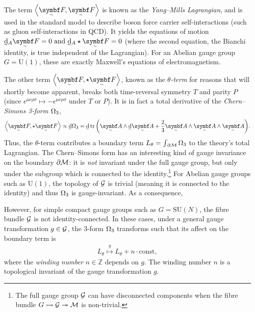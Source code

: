 The term $\ang{\tsbm F, \tsbm F}$ is known as the \emph{Yang--Mills Lagrangian}, and is used in the standard model to describe boson force carrier self-interactions (such as gluon self-interactions in QCD).
It yields the equations of motion 
\begin{math}
	\ts\dd_A\tsbm F = 0
	\text{ and }
	\ts\dd_A\star\tsbm F = 0
\end{math}
(where the second equation, the Bianchi identity, is true independent of the Lagrangian).
For an Abelian gauge group $G = \mathrm{U}(1)$, these are exactly Maxwell's equations of electromagnetism.

The other term $\ang{\tsbm F, \star\tsbm F}$, known as the \emph{$\theta$-term} for reasons that will shortly become apparent, breaks both time-reversal symmetry $T$ and parity $P$ (since $\epsilon^{\mu\nu\rho\sigma} \mapsto -\epsilon^{\mu\nu\rho\sigma}$ under $T$ or $P$).
It is in fact a total derivative of the \emph{Chern--Simons 3-form} $\csform$,
\begin{align}
	\ang{\tsbm F, \star\tsbm F}
	\propto \ts\dd\csform
	= \ts\dd\tr\qty(\tsbm A\wedge\ts\dd\tsbm A + \frac{2}{3}\tsbm A\wedge\tsbm A\wedge\tsbm A)
.\end{align}
Thus, the $\theta$-term contributes a boundary term $L_\theta = \int_{\raisemath{1pt}{\,\partial\cal M}}\csform$ to the theory's total Lagrangian.
The Chern--Simons form has an interesting kind of gauge invariance on the boundary $\partial\cal M$: it is \emph{not} invariant under the full gauge group, but only under the subgroup which is connected to the identity.\footnote{
	The full gauge group $\cal G$ can have disconnected components when the fibre bundle $\fibrebundle{G}{\cal G}{\cal M}$ is non-trivial. 
}
For Abelian gauge groups such as $\mathrm{U}(1)$, the topology of $\cal G$ is trivial (meaning it is connected to the identity) and thus $\csform$ is gauge-invariant.
As a consequence, 

\cite{Witten_1989}

However, for simple compact gauge groups such as $G = \mathrm{SU}(N)$, the fibre bundle $\cal G$ is not identity-connected.
In these cases, under a general gauge transformation $g \in \cal G$, the 3-form $\csform$ transforms such that its affect on the boundary term is
\begin{align}
	L_\theta \overset{g}{\mapsto} L_\theta + n\cdot\text{const}
,\end{align}
where the \emph{winding number} $n \in \mathds Z$ depends on $g$.
The winding number $n$ is a topological invariant of the gauge transformation $g$.

